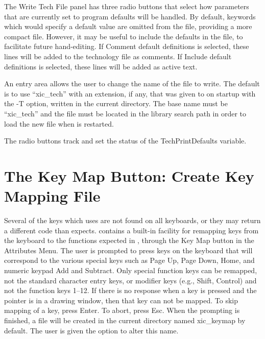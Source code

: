 The {\cb Write Tech File} panel has three radio buttons that select
how parameters that are currently set to program defaults will be
handled.  By default, keywords which would specify a default value are
omitted from the file, providing a more compact file.  However, it may
be useful to include the defaults in the file, to facilitate future
hand-editing.  If {\cb Comment default definitions} is selected, these
lines will be added to the technology file as comments.  If {\cb
Include default definitions} is selected, these lines will be added as
active text.

An entry area allows the user to change the name of the file to write. 
The default is to use ``{\vt xic\_tech}'' with an extension, if any,
that was given to {\Xic} on startup with the {\vt -T} option, written
in the current directory.  The base name must be ``{\vt xic\_tech}''
and the file must be located in the library search path in order to
load the new file when {\Xic} is restarted.

The radio buttons track and set the status of the
{\et TechPrintDefaults} variable.   


\section{The {\cb Key Map} Button: Create Key Mapping File}
Several of the keys which {\Xic} uses are not found on all keyboards,
or they may return a different code than {\Xic} expects.  {\Xic}
contains a built-in facility for remapping keys from the keyboard to
the functions expected in {\Xic}, through the {\cb Key Map} button in
the {\cb Attributes Menu}.  The user is prompted to press keys on the
keyboard that will correspond to the various special keys such as {\kb
Page Up}, {\kb Page Down}, {\kb Home}, and numeric keypad {\kb Add}
and {\kb Subtract}.  Only special function keys can be remapped, not
the standard character entry keys, or modifier keys (e.g., {\kb
Shift}, {\kb Control}) and not the function keys 1--12.  If there is
no response when a key is pressed and the pointer is in a drawing
window, then that key can not be mapped.  To skip mapping of a key,
press {\kb Enter}.  To abort, press {\kb Esc}.  When the prompting is
finished, a file will be created in the current directory named {\vt
xic\_keymap} by default.  The user is given the option to alter this
name.

